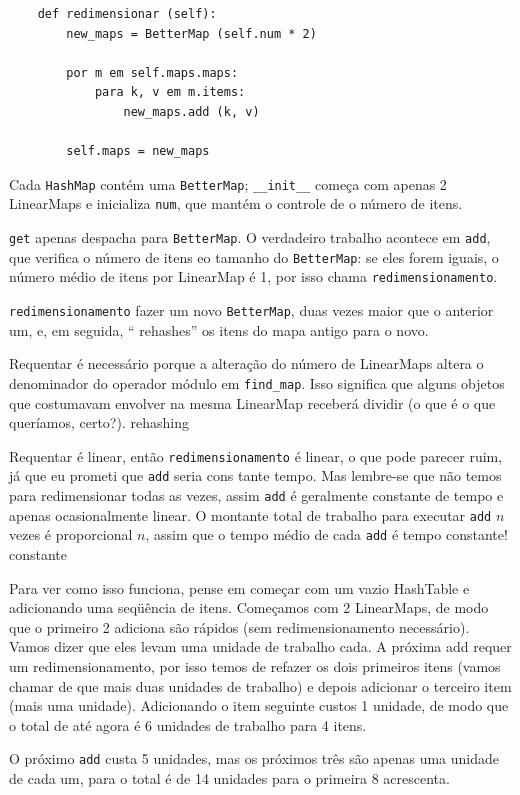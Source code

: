 \documentclass[10pt]{book}
\begin{document}
\begin{v erbatim}
\begin{verbatim}
    def redimensionar (self):
        new_maps = BetterMap (self.num * 2)

        por m em self.maps.maps:
            para k, v em m.items:
                new_maps.add (k, v)

        self.maps = new_maps
\end{verbatim}

Cada {\tt HashMap} contém uma {\tt BetterMap}; \verb "__init__" começa
com apenas 2 LinearMaps e inicializa {\tt num}, que mantém o controle de
o número de itens.

{\tt get} apenas despacha para {\tt BetterMap}. O verdadeiro trabalho acontece
em {\tt add}, que verifica o número de itens eo tamanho do
{\tt BetterMap}: se eles forem iguais, o número médio de itens por
LinearMap é 1, por isso chama {\tt redimensionamento}.

{\tt redimensionamento} fazer um novo {\tt BetterMap}, duas vezes maior que o anterior
um, e, em seguida, `` rehashes'' os itens do mapa antigo para o novo.

Requentar é necessário porque a alteração do número de LinearMaps
altera o denominador do operador módulo em
\Verb "find_map". Isso significa que alguns objetos que costumavam
envolver na mesma LinearMap receberá dividir (o que é
o que queríamos, certo?).
\index{} rehashing

Requentar é linear, então
{\tt redimensionamento} é linear, o que pode parecer ruim, já que eu prometi
que {\tt add} seria cons tante tempo. Mas lembre-se que
não temos para redimensionar todas as vezes, assim {\tt add} é geralmente
constante de tempo e apenas ocasionalmente linear. O montante total
de trabalho para executar {\tt add} $ n $ vezes é proporcional $ n $,
assim que o tempo médio de cada {\tt add} é tempo constante!
 constante

Para ver como isso funciona, pense em começar com um vazio
HashTable e adicionando uma seqüência de itens. Começamos com 2 LinearMaps,
de modo que o primeiro 2 adiciona são rápidos (sem redimensionamento necessário). Vamos
dizer que eles levam uma unidade de trabalho cada. A próxima add
requer um redimensionamento, por isso temos de refazer os dois primeiros
itens (vamos chamar de que mais duas unidades de trabalho) e depois
adicionar o terceiro item (mais uma unidade). Adicionando o item seguinte
custos 1 unidade, de modo que o total de até agora é
6 unidades de trabalho para 4 itens.

O próximo {\tt add} custa 5 unidades, mas os próximos três
são apenas uma unidade de cada um, para o total é de 14 unidades para o
primeira 8 acrescenta.


\end{v erbatim}
\end{document}
